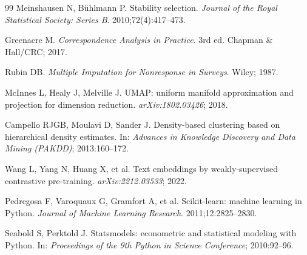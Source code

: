 \documentclass[11pt,a4paper]{article}
\begin{document}
\begin{thebibliography}{99}
 Meinshausen N, B\"uhlmann P. Stability selection.
\emph{Journal of the Royal Statistical Society: Series B}. 2010;72(4):417--473.

 Greenacre M. \emph{Correspondence Analysis in Practice}.
3rd ed. Chapman \& Hall/CRC; 2017.

 Rubin DB. \emph{Multiple Imputation for Nonresponse in Surveys}.
Wiley; 1987.

 McInnes L, Healy J, Melville J. UMAP: uniform manifold
approximation and projection for dimension reduction. \emph{arXiv:1802.03426}; 2018.

 Campello RJGB, Moulavi D, Sander J. Density-based clustering
based on hierarchical density estimates. In: \emph{Advances in Knowledge Discovery and
Data Mining (PAKDD)}; 2013:160--172.

 Wang L, Yang N, Huang X, et al. Text embeddings by weakly-supervised
contrastive pre-training. \emph{arXiv:2212.03533}; 2022.

 Pedregosa F, Varoquaux G, Gramfort A, et al. Scikit-learn:
machine learning in Python.
\emph{Journal of Machine Learning Research}. 2011;12:2825--2830.

 Seabold S, Perktold J. Statsmodels: econometric and statistical
modeling with Python. In: \emph{Proceedings of the 9th Python in Science Conference};
2010:92--96.

\end{thebibliography}
\end{document}
